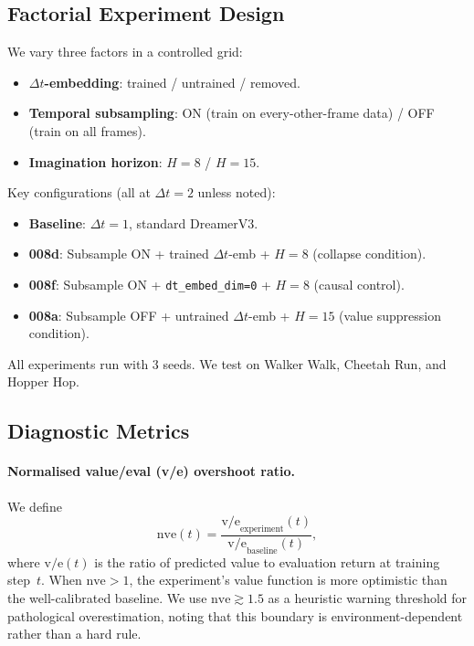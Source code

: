 \documentclass[letterpaper]{article}
\begin{document}
\subsection{Factorial Experiment Design}

We vary three factors in a controlled grid:
\begin{itemize}[nosep]
    \item \textbf{$\Delta t$-embedding}: trained / untrained / removed.
    \item \textbf{Temporal subsampling}: ON (train on every-other-frame data) / OFF (train on all frames).
    \item \textbf{Imagination horizon}: $H{=}8$ / $H{=}15$.
\end{itemize}

Key configurations (all at $\Delta t{=}2$ unless noted):
\begin{itemize}[nosep]
    \item \textbf{Baseline}: $\Delta t{=}1$, standard DreamerV3.
    \item \textbf{008d}: Subsample ON + trained $\Delta t$-emb + $H{=}8$ (collapse condition).
    \item \textbf{008f}: Subsample ON + \texttt{dt\_embed\_dim=0} + $H{=}8$ (causal control).
    \item \textbf{008a}: Subsample OFF + untrained $\Delta t$-emb + $H{=}15$ (value suppression condition).
\end{itemize}

All experiments run with 3 seeds. We test on Walker Walk, Cheetah Run, and Hopper Hop.

\subsection{Diagnostic Metrics}

\paragraph{Normalised value/eval (v/e) overshoot ratio.}
We define
\[
\text{nve}(t) = \frac{\text{v/e}_{\text{experiment}}(t)}{\text{v/e}_{\text{baseline}}(t)},
\]
where $\text{v/e}(t)$ is the ratio of predicted value to evaluation return at training step~$t$.
When $\text{nve} > 1$, the experiment's value function is more optimistic than the well-calibrated baseline.
We use $\text{nve} \gtrsim 1.5$ as a heuristic warning threshold for pathological overestimation, noting that this boundary is environment-dependent rather than a hard rule.
\end{document}

